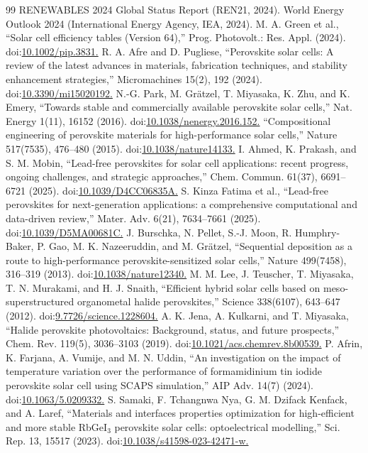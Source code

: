 \documentclass[review]{elsarticle}
\begin{document}
\begin{thebibliography}{99}
 RENEWABLES 2024 Global Status Report (REN21, 2024).
 World Energy Outlook 2024 (International Energy Agency, IEA, 2024).
 M. A. Green et al., ``Solar cell efficiency tables (Version 64),'' Prog. Photovolt.: Res. Appl. (2024). doi:\url{10.1002/pip.3831.}
 R. A. Afre and D. Pugliese, ``Perovskite solar cells: A review of the latest advances in materials, fabrication techniques, and stability enhancement strategies,'' Micromachines 15(2), 192 (2024). doi:\url{10.3390/mi15020192.}
 N.-G. Park, M. Grätzel, T. Miyasaka, K. Zhu, and K. Emery, ``Towards stable and commercially available perovskite solar cells,'' Nat. Energy 1(11), 16152 (2016). doi:\url{10.1038/nenergy.2016.152.}
 ``Compositional engineering of perovskite materials for high-performance solar cells,'' Nature 517(7535), 476--480 (2015). doi:\url{10.1038/nature14133.}
 I. Ahmed, K. Prakash, and S. M. Mobin, ``Lead-free perovskites for solar cell applications: recent progress, ongoing challenges, and strategic approaches,'' Chem. Commun. 61(37), 6691--6721 (2025). doi:\url{10.1039/D4CC06835A.}
 S. Kinza Fatima et al., ``Lead-free perovskites for next-generation applications: a comprehensive computational and data-driven review,'' Mater. Adv. 6(21), 7634--7661 (2025). doi:\url{10.1039/D5MA00681C.}
 J. Burschka, N. Pellet, S.-J. Moon, R. Humphry-Baker, P. Gao, M. K. Nazeeruddin, and M. Grätzel, ``Sequential deposition as a route to high-performance perovskite-sensitized solar cells,'' Nature 499(7458), 316--319 (2013). doi:\url{10.1038/nature12340.}
 M. M. Lee, J. Teuscher, T. Miyasaka, T. N. Murakami, and H. J. Snaith, ``Efficient hybrid solar cells based on meso-superstructured organometal halide perovskites,'' Science 338(6107), 643--647 (2012). doi:\url{9.7726/science.1228604.}
 A. K. Jena, A. Kulkarni, and T. Miyasaka, ``Halide perovskite photovoltaics: Background, status, and future prospects,'' Chem. Rev. 119(5), 3036--3103 (2019). doi:\url{10.1021/acs.chemrev.8b00539.}
 P. Afrin, K. Farjana, A. Vumije, and M. N. Uddin, ``An investigation on the impact of temperature variation over the performance of formamidinium tin iodide perovskite solar cell using SCAPS simulation,'' AIP Adv. 14(7) (2024). doi:\url{10.1063/5.0209332.}
 S. Samaki, F. Tchangnwa Nya, G. M. Dzifack Kenfack, and A. Laref, ``Materials and interfaces properties optimization for high-efficient and more stable RbGeI$_{3}$ perovskite solar cells: optoelectrical modelling,'' Sci. Rep. 13, 15517 (2023). doi:\url{10.1038/s41598-023-42471-w.}

\end{thebibliography}
\end{document}
